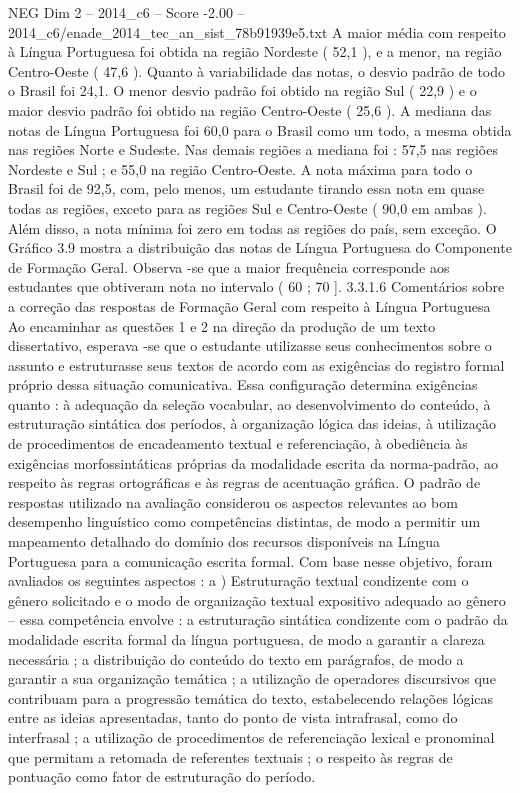 \begin{textsample}{NEG Dim 2 – 2014\_c6 – Score -2.00 – 2014\_c6/enade\_2014\_tec\_an\_sist\_78b91939e5.txt}
A maior média com respeito à Língua Portuguesa foi obtida na região Nordeste ( 52,1 ), e a menor, na região Centro-Oeste ( 47,6 ).
Quanto à variabilidade das notas, o desvio padrão de todo o Brasil foi 24,1.
O menor desvio padrão foi obtido na região Sul ( 22,9 ) e o maior desvio padrão foi obtido na região Centro-Oeste ( 25,6 ).
A mediana das notas de Língua Portuguesa foi 60,0 para o Brasil como um todo, a mesma obtida nas regiões Norte e Sudeste.
Nas demais regiões a mediana foi : 57,5 nas regiões Nordeste e Sul ; e 55,0 na região Centro-Oeste.
A nota máxima para todo o Brasil foi de 92,5, com, pelo menos, um estudante tirando essa nota em quase todas as regiões, exceto para as regiões Sul e Centro-Oeste ( 90,0 em ambas ).
Além disso, a nota mínima foi zero em todas as regiões do país, sem exceção.
O Gráfico 3.9 mostra a distribuição das notas de Língua Portuguesa do Componente de Formação Geral.
Observa -se que a maior frequência corresponde aos estudantes que obtiveram nota no intervalo ( 60 ; 70 ]. 3.3.1.6 Comentários sobre a correção das respostas de Formação Geral com respeito à Língua Portuguesa Ao encaminhar as questões 1 e 2 na direção da produção de um texto dissertativo, esperava -se que o estudante utilizasse seus conhecimentos sobre o assunto e estruturasse seus textos de acordo com as exigências do registro formal próprio dessa situação comunicativa.
Essa configuração determina exigências quanto : à adequação da seleção vocabular, ao desenvolvimento do conteúdo, à estruturação sintática dos períodos, à organização lógica das ideias, à utilização de procedimentos de encadeamento textual e referenciação, à obediência às exigências morfossintáticas próprias da modalidade escrita da norma-padrão, ao respeito às regras ortográficas e às regras de acentuação gráfica.
O padrão de respostas utilizado na avaliação considerou os aspectos relevantes ao bom desempenho linguístico como competências distintas, de modo a permitir um mapeamento detalhado do domínio dos recursos disponíveis na Língua Portuguesa para a comunicação escrita formal.
Com base nesse objetivo, foram avaliados os seguintes aspectos : a ) Estruturação textual condizente com o gênero solicitado e o modo de organização textual expositivo adequado ao gênero – essa competência envolve : a estruturação sintática condizente com o padrão da modalidade escrita formal da língua portuguesa, de modo a garantir a clareza necessária ; a distribuição do conteúdo do texto em parágrafos, de modo a garantir a sua organização temática ; a utilização de operadores discursivos que contribuam para a progressão temática do texto, estabelecendo relações lógicas entre as ideias apresentadas, tanto do ponto de vista intrafrasal, como do interfrasal ; a utilização de procedimentos de referenciação lexical e pronominal que permitam a retomada de referentes textuais ; o respeito às regras de pontuação como fator de estruturação do período.

\end{textsample}
